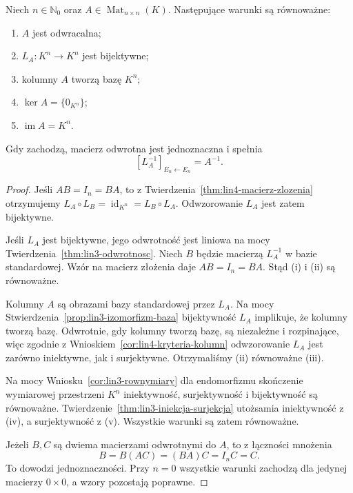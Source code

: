 \begin{twierdzenie}
\label{thm:lin4-odwracalnosc-kryteria}
Niech \(n\in\mathbb N_0\) oraz
\(A\in\operatorname{Mat}_{n\times n}(K)\).
Następujące warunki są równoważne:
\begin{enumerate}[label=(\roman*)]
\item \(A\) jest odwracalna;
\item \(L_A\colon K^n\to K^n\) jest bijektywne;
\item kolumny \(A\) tworzą bazę \(K^n\);
\item \(\ker A=\{0_{K^n}\}\);
\item \(\operatorname{im}A=K^n\).
\end{enumerate}
Gdy zachodzą, macierz odwrotna jest jednoznaczna
i spełnia
\[
 [L_A^{-1}]_{E_n\leftarrow E_n}=A^{-1}.
\]
\end{twierdzenie}
\begin{proof}
Jeśli \(AB=I_n=BA\), to
z Twierdzenia~\ref{thm:lin4-macierz-zlozenia}
otrzymujemy
\(L_A\circ L_B=\operatorname{id}_{K^n}
 =L_B\circ L_A\).
Odwzorowanie \(L_A\) jest zatem bijektywne.

Jeśli \(L_A\) jest bijektywne,
jego odwrotność jest liniowa na mocy
Twierdzenia~\ref{thm:lin3-odwrotnosc}.
Niech \(B\) będzie macierzą \(L_A^{-1}\)
w bazie standardowej.
Wzór na macierz złożenia daje
\(AB=I_n=BA\). Stąd (i) i (ii)
są równoważne.

Kolumny \(A\) są obrazami bazy standardowej
przez \(L_A\). Na mocy
Stwierdzenia~\ref{prop:lin3-izomorfizm-baza}
bijektywność \(L_A\) implikuje, że kolumny
tworzą bazę. Odwrotnie, gdy kolumny
tworzą bazę, są niezależne i rozpinające,
więc zgodnie z Wnioskiem~\ref{cor:lin4-kryteria-kolumn}
odwzorowanie \(L_A\) jest zarówno iniektywne,
jak i surjektywne. Otrzymaliśmy (ii)
równoważne (iii).

Na mocy Wniosku~\ref{cor:lin3-rownymiary}
dla endomorfizmu skończenie wymiarowej
przestrzeni \(K^n\) iniektywność,
surjektywność i bijektywność są równoważne.
Twierdzenie~\ref{thm:lin3-iniekcja-surjekcja}
utożsamia iniektywność z (iv),
a surjektywność z (v).
Wszystkie warunki są zatem równoważne.

Jeżeli \(B,C\) są dwiema macierzami odwrotnymi
do \(A\), to z łączności mnożenia
\[
 B=B(AC)=(BA)C=I_nC=C.
\]
To dowodzi jednoznaczności.
Przy \(n=0\) wszystkie warunki zachodzą
dla jedynej macierzy \(0\times0\),
a wzory pozostają poprawne.
\end{proof}

